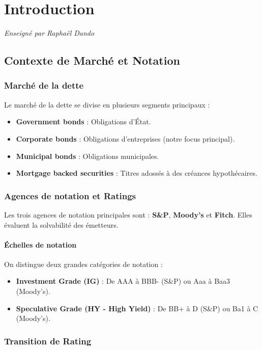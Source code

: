 \chapter{Introduction}
\textit{Enseigné par Raphaël Dando}

\section{Contexte de Marché et Notation}

\subsection{Marché de la dette}

Le marché de la dette se divise en plusieurs segments principaux :
\begin{itemize}
    \item \textbf{Government bonds} : Obligations d'État.
    \item \textbf{Corporate bonds} : Obligations d'entreprises (notre focus principal).
    \item \textbf{Municipal bonds} : Obligations municipales.
    \item \textbf{Mortgage backed securities} : Titres adossés à des créances hypothécaires.
\end{itemize}

\subsection{Agences de notation et Ratings}

Les trois agences de notation principales sont : \textbf{S\&P}, \textbf{Moody's} et \textbf{Fitch}. Elles évaluent la solvabilité des émetteurs.

\subsubsection{Échelles de notation}

On distingue deux grandes catégories de notation :
\begin{itemize}
    \item \textbf{Investment Grade (IG)} : De AAA à BBB- (S\&P) ou Aaa à Baa3 (Moody's).
    \item \textbf{Speculative Grade (HY - High Yield)} : De BB+ à D (S\&P) ou Ba1 à C (Moody's).
\end{itemize}

\subsection{Transition de Rating}

